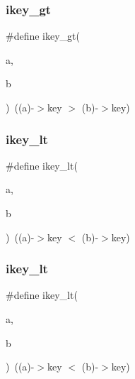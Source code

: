 \subsubsection{\texorpdfstring{ikey\+\_\+gt}{ikey\_gt}\hspace{0.1cm}{\footnotesize\ttfamily [3/3]}}
{\footnotesize\ttfamily \#define ikey\+\_\+gt(\begin{DoxyParamCaption}\item[{}]{a,  }\item[{}]{b }\end{DoxyParamCaption})~((a)-\/$>$key $>$ (b)-\/$>$key)}

\mbox{\label{a00140_ae2275beb4f8212a5a1b8299bd57f0595}} 
\subsubsection{\texorpdfstring{ikey\+\_\+lt}{ikey\_lt}\hspace{0.1cm}{\footnotesize\ttfamily [1/3]}}
{\footnotesize\ttfamily \#define ikey\+\_\+lt(\begin{DoxyParamCaption}\item[{}]{a,  }\item[{}]{b }\end{DoxyParamCaption})~((a)-\/$>$key $<$ (b)-\/$>$key)}

\mbox{\label{a00140_ae2275beb4f8212a5a1b8299bd57f0595}} 
\subsubsection{\texorpdfstring{ikey\+\_\+lt}{ikey\_lt}\hspace{0.1cm}{\footnotesize\ttfamily [2/3]}}
{\footnotesize\ttfamily \#define ikey\+\_\+lt(\begin{DoxyParamCaption}\item[{}]{a,  }\item[{}]{b }\end{DoxyParamCaption})~((a)-\/$>$key $<$ (b)-\/$>$key)}

\mbox{\label{a00140_ae2275beb4f8212a5a1b8299bd57f0595}} 
